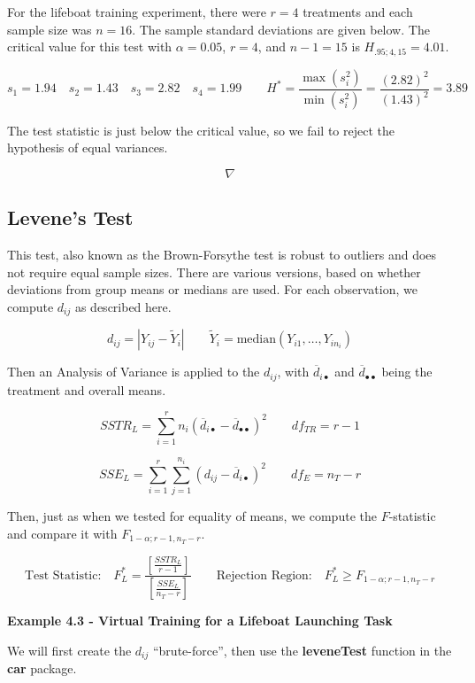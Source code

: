 \documentclass[
]{book}
\begin{document}
For the lifeboat training experiment, there were \(r=4\) treatments and
each sample size was \(n=16\). The sample standard deviations are given
below. The critical value for this test with \(\alpha=0.05\), \(r=4\),
and \(n-1=15\) is \(H_{.95;4,15}=4.01\).

\[
s_1=1.94 \quad s_2=1.43 \quad s_3=2.82 \quad s_4=1.99
\qquad H^*=\frac{\max\left(s_i^2\right)}{\min\left(s_i^2\right)}=
\frac{(2.82)^2}{(1.43)^2}=3.89
\]

The test statistic is just below the critical value, so we fail to
reject the hypothesis of equal variances.

\[ \nabla \]

\subsection{Levene's Test}\label{levenes-test}

This test, also known as the Brown-Forsythe test is robust to outliers
and does not require equal sample sizes. There are various versions,
based on whether deviations from group means or medians are used. For
each observation, we compute \(d_{ij}\) as described here.

\[
d_{ij}= \left|Y_{ij}-\tilde{Y}_i\right| \qquad  
\tilde{Y}_i=\mbox{median}\left(Y_{i1},\ldots ,Y_{in_i}\right)
\]

Then an Analysis of Variance is applied to the \(d_{ij}\), with
\(\overline{d}_{i\bullet}\) and \(\overline{d}_{\bullet\bullet}\) being
the treatment and overall means.

\[
SSTR_L = \sum_{i=1}^rn_i\left(\overline{d}_{i\bullet}-
\overline{d}_{\bullet\bullet}\right)^2  \qquad df_{TR}=r-1 
\]

\[
SSE_L = \sum_{i=1}^r\sum_{j=1}^{n_i}\left(d_{ij}-\overline{d}_{i\bullet}\right)^2
\qquad df_E = n_T-r
\]

Then, just as when we tested for equality of means, we compute the
\(F\)-statistic and compare it with \(F_{1-\alpha;r-1,n_T-r}\).

\[
\mbox{Test Statistic:} \quad F_L^* = \frac{\left[\frac{SSTR_L}{r-1}\right]}
           {\left[\frac{SSE_L}{n_T-r}\right]} \qquad
\mbox{Rejection Region:} \quad F_L^* \ge F_{1-\alpha;r-1,n_T-r}
\]

\textbf{Example 4.3 - Virtual Training for a Lifeboat Launching Task }

We will first create the \(d_{ij}\) ``brute-force'', then use the
\textbf{leveneTest} function in the \textbf{car} package.
\end{document}

